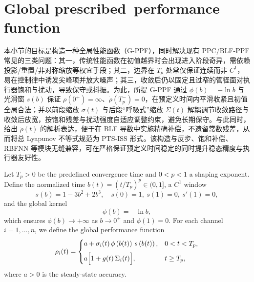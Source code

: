 \documentclass[pdflatex,sn-mathphys-num]{sn-jnl}%
\theoremstyle{thmstyleone}%
\theoremstyle{thmstyletwo}%
\theoremstyle{thmstylethree}%
\begin{document}
\section{Global prescribed–performance function}


本小节的目标是构造一种全局性能函数（G-PPF），同时解决现有 PPC/BLF-PPF 常见的三类问题：其一，传统性能函数在初值越界时会出现进入阶段奇异，需依赖投影/重置/非对称缩放等权宜手段；其二，边界在 $T_p$ 处常仅保证连续而非 $C^1$，易在控制律中诱发尖峰项并放大噪声；其三，收敛后仍以固定且过窄的管径面对执行器饱和与扰动，导致保守或抖振。为此，所提 G-PPF 通过 $\phi(b)=-\ln b$ 与光滑窗 $s(b)$ 保证 $\rho(0^+)=\infty$、$\dot\rho(T_p^-)=0$，在预定义时间内平滑收紧且初值全局合法；并以前段缩放 $\sigma(t)$ 与后段“呼吸式”缩放 $\Sigma(t)$ 解耦调节收敛路径与收敛后放宽，按饱和残差与扰动强度自适应调整约束，避免长期保守。与此同时，给出 $\dot\rho(t)$ 的解析表达，便于在 BLF 导数中实施精确补偿，不遗留常数残差，从而将总 Lyapunov 不等式规范为 PTS-ISS 形式。该构造与反步、饱和补偿、RBFNN 等模块无缝兼容，可在严格保证预定义时间稳定的同时提升稳态精度与执行器友好性。

Let $T_p>0$ be the predefined convergence time and $0<p<1$ a shaping exponent.
Define the normalized time $b(t)=(t/T_p)^p\in(0,1]$, a $C^1$ window
\begin{equation}\label{eq:gppf-window}
s(b)=1-3b^2+2b^3,\quad s(0)=1,\ s(1)=0,\ s'(1)=0,
\end{equation}
and the global kernel
\begin{equation}\label{eq:gppf-kernel}
\phi(b) = -\ln b,
\end{equation}
which ensures $\phi(b)\to+\infty$ as $b\to0^+$ and $\phi(1)=0$.
For each channel $i=1,\dots,n$, we define the global performance function
\begin{equation}\label{eq:gppf-def}
\rho_i(t)=
\begin{cases}
\displaystyle a + \sigma_i(t)\,\phi\left(b(t)\right)\,s\left(b(t)\right), & 0<t<T_p,\\[6pt]
\displaystyle a\Bigl[1 + g(t)\,\Sigma_i(t)\Bigr], & t\ge T_p,
\end{cases}
\end{equation}
where $a>0$ is the steady-state accuracy.
\end{document}
